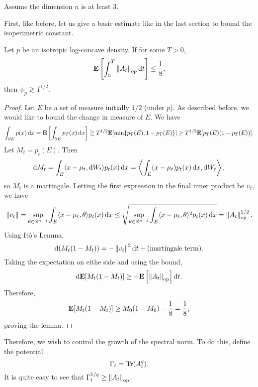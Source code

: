 \documentclass{article}
\begin{document}
		Assume the dimension $n$ is at least $3$.

		First, like before, let us give a basic estimate like in the last section to bound the isoperimetric constant.

		\begin{lemma}
			\label{chen basic estimate}
			Let $p$ be an isotropic log-concave density. If for some $T > 0$,
			\[ \textbf{E}\left[\int_0^T \left\lVert A_t\right\rVert_{\text{op}} \operatorname{d}\!{t} \right] \leq \frac{1}{8}, \]
			then $\psi_p \gtrsim T^{1/2}$.
		\end{lemma}
		\begin{proof}
			Let $E$ be a set of measure initially $1/2$ (under $p$). As described before, we would like to bound the change in measure of $E$.
			We have
			\[ \int_{\partial E} p(x) \operatorname{d}\!{x} = \textbf{E}\left[\int_{\partial E} p_T(x) \operatorname{d}\!{x}\right] \gtrsim T^{1/2} \textbf{E}[\min\{p_T(E),1-p_T(E)\}] \geq T^{1/2} \textbf{E}[p_T(E)(1-p_T(E))]. \]
			Let $M_t = p_t(E)$. Then
			\[ \operatorname{d}\!{M_t} = \int_E \langle x-\mu_t, \operatorname{d}\!{W}_t \rangle p_t(x) \operatorname{d}\!{x} = \left\langle \int_E (x-\mu_t) p_t(x) \operatorname{d}\!{x} , \operatorname{d}\!{W_t} \right\rangle, \]
			so $M_t$ is a martingale. Letting the first expression in the final inner product be $v_t$, we have
			\[ \left\lVert v_t\right\rVert = \sup_{\theta \in S^{n-1}} \int_E \langle x-\mu_t , \theta \rangle p_t(x) \operatorname{d}\!{x} \leq \sqrt{ \sup_{\theta \in S^{n-1}} \int_E \langle x-\mu_t , \theta \rangle^2 p_t(x) \operatorname{d}\!{x} } = \left\lVert A_t\right\rVert_{\text{op}}^{1/2}. \]
			Using It\^{o}'s Lemma,
			\[ \operatorname{d}\!{(M_t(1-M_t))} = -\left\lVert v_t\right\rVert^2\operatorname{d}\!{t} + \text{(martingale term)}. \]
			Taking the expectation on eithe side and using the bound,
			\[ \operatorname{d}\!{\textbf{E}[M_t(1-M_t)]} \geq -\textbf{E}\left[\left\lVert A_t\right\rVert_{\text{op}}\right]\operatorname{d}\!{t}. \]
			Therefore,
			\[ \textbf{E}[M_t(1-M_t)] \geq M_0(1-M_0) - \frac{1}{8} = \frac{1}{8}, \]
			proving the lemma.
		\end{proof}

		Therefore, we wish to control the growth of the spectral norm. To do this, define the potential
		\[ \Gamma_t = \operatorname{Tr}(A_t^q). \]
		It is quite easy to see that $\Gamma_t^{1/q} \geq \left\lVert A_t\right\rVert_{\text{op}}$.
\end{document}
